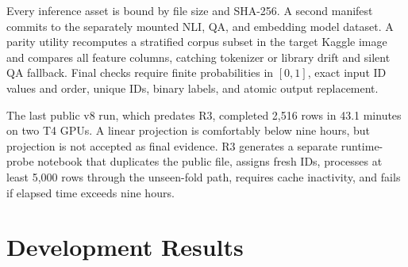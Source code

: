 \documentclass[11pt]{article}
\begin{document}
Every inference asset is bound by file size and SHA-256. A second manifest commits to
the separately mounted NLI, QA, and embedding model dataset. A parity utility
recomputes a stratified corpus subset in the target Kaggle image and compares all
feature columns, catching tokenizer or library drift and silent QA fallback. Final
checks require finite probabilities in $[0,1]$, exact input ID values and order,
unique IDs, binary labels, and atomic output replacement.

The last public v8 run, which predates R3, completed 2,516 rows in 43.1 minutes on
two T4 GPUs. A linear projection is comfortably below nine hours, but projection is
not accepted as final evidence. R3 generates a separate runtime-probe notebook that
duplicates the public file, assigns fresh IDs, processes at least 5,000 rows through
the unseen-fold path, requires cache inactivity, and fails if elapsed time exceeds
nine hours.

\section{Development Results}

\begin{table}[t]
\centering
\small
{}
\caption{F1$_0$ on the 299 organizer-labeled development examples before any
reproduction mechanism. These are recorded development experiments, not held-out
Phase-2 results. The first four rows are earlier measurements; the final row is the
shipped R3 operating point, computed once from the five-fold out-of-fold predictions
in \texttt{blend\_config.json} (context routed to the stack, no-context to the judge)
and applied without any inference-time refitting. This removes the calibration/test
scale mismatch present in the earlier in-kernel blend.}
\label{tab:results}
\end{table}
\end{document}

